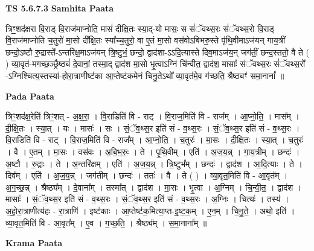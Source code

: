 \documentclass[17pt]{extarticle}
\begin{document}
\textbf{TS 5.6.7.3 } \newline
\textbf{Samhita Paata} \newline

त्रिꣳ॒॒शद॑क्षरा वि॒राड् वि॒राज॑माप्नोति॒ मासं॑ दीक्षि॒तः स्या॒द्-यो मासः॒ स सं॑ॅवथ्स॒रः सं॑ॅवथ्स॒रो वि॒राड् वि॒राज॑माप्नोति च॒तुरो॑ मा॒सो दी᳚क्षि॒तः स्या᳚च्च॒तुरो॒ वा ए॒तं मा॒सो वस॑वोऽबिभरु॒स्ते पृ॑थि॒वीमाऽज॑यन् गाय॒त्रीं छन्दो॒ऽष्टौ रु॒द्रास्ते᳚-ऽन्तरि॑क्ष॒माऽज॑यन् त्रि॒ष्टुभं॒ छन्दो॒ द्वाद॑शा-ऽऽदि॒त्यास्ते दिव॒माऽज॑य॒न् जग॑तीं॒ छन्द॒स्ततो॒ वै ते ( ) व्या॒वृत॑-मगच्छ॒ञ्छ्रैष्ठ्यं॑ दे॒वानां॒ तस्मा॒द् द्वाद॑श मा॒सो भृ॒त्वाऽग्निं चि॑न्वीत॒ द्वाद॑श॒ मासाः᳚ संॅवथ्स॒रः सं॑ॅवथ्स॒रो᳚ -ऽग्निश्चित्य॒स्तस्या॑-होरा॒त्राणीष्ट॑का आ॒प्तेष्ट॑कमेनं चिनु॒तेऽथो᳚ व्या॒वृत॑मे॒व ग॑च्छति॒ श्रैष्ठ्यꣳ॑ समा॒नानां᳚ ॥ \newline

\textbf{Pada Paata} \newline

त्रिꣳ॒॒शद॑क्ष॒रेति॑ त्रिꣳ॒॒शत् - अ॒क्ष॒रा॒ । वि॒राडिति॑ वि - राट् । वि॒राज॒मिति॑ वि - राज᳚म् । आ॒प्नो॒ति॒ । मास᳚म् । दी॒क्षि॒तः । स्या॒त् । यः । मासः॑ । सः । सं॒ॅव॒थ्स॒र इति॑ सं - व॒थ्स॒रः । सं॒ॅव॒थ्स॒र इति॑ सं - व॒थ्स॒रः । वि॒राडिति॑ वि - राट् । वि॒राज॒मिति॑ वि - राज᳚म् । आ॒प्नो॒ति॒ । च॒तुरः॑ । मा॒सः । दी॒क्षि॒तः । स्या॒त् । च॒तुरः॑ । वै । ए॒तम् । मा॒सः । वस॑वः । अ॒बि॒भ॒रुः॒ । ते । पृ॒थि॒वीम् । एति॑ । अ॒ज॒य॒न्न् । गा॒य॒त्रीम् । छन्दः॑ । अ॒ष्टौ । रु॒द्राः । ते । अ॒न्तरि॑क्षम् । एति॑ । अ॒ज॒य॒न्न् । त्रि॒ष्टुभ᳚म् । छन्दः॑ । द्वाद॑श । आ॒दि॒त्याः । ते । दिव᳚म् । एति॑ । अ॒ज॒य॒न्न् । जग॑तीम् । छन्दः॑ । ततः॑ । वै । ते ( ) । व्या॒वृत॒मिति॑ वि - आ॒वृत᳚म् । अ॒ग॒च्छ॒न्न् । श्रैष्ठ्य᳚म् । दे॒वाना᳚म् । तस्मा᳚त् । द्वाद॑श । मा॒सः । भृ॒त्वा । अ॒ग्निम् । चि॒न्वी॒त॒ । द्वाद॑श । मासाः᳚ । सं॒ॅव॒थ्स॒र इति॑ सं - व॒थ्स॒रः । सं॒ॅव॒थ्स॒र इति॑ सं - व॒थ्स॒रः । अ॒ग्निः । चित्यः॑ । तस्य॑ । अ॒हो॒रा॒त्राणीत्य॑हः - रा॒त्राणि॑ । इष्ट॑काः । आ॒प्तेष्ट॑क॒मित्या॒प्त-इ॒ष्ट॒क॒म् । ए॒न॒म् । चि॒नु॒ते॒ । अथो॒ इति॑ । व्या॒वृत॒मिति॑ वि - आ॒वृत᳚म् । ए॒व । ग॒च्छ॒ति॒ । श्रैष्ठ्य᳚म् । स॒मा॒नाना᳚म् ॥  \newline


\textbf{Krama Paata} \newline
\end{document}
